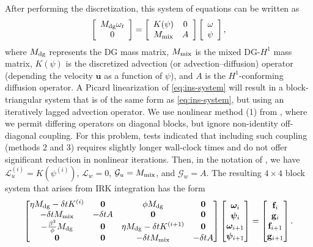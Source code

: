 \documentclass[review]{siamart}
\begin{document}
After performing the discretization, this system of equations can be written as
\begin{equation}
	\label{eq:ins-system}
	\left[ \begin{array}{c} M_{\rm dg} \omega_t \\ 0 \end{array} \right]
	=
	\left[ \begin{array}{cc} K(\psi) & 0 \\ M_{\rm mix} & A \end{array} \right]
	\left[ \begin{array}{c} \omega \\ \psi \end{array} \right],
\end{equation}
where $M_{\rm dg}$ represents the DG mass matrix, $M_{\rm mix}$ is the mixed
DG-$H^1$ mass matrix, $K(\psi)$ is the discretized advection (or
advection--diffusion) operator (depending the velocity $\bm u$ as a function of
$\psi$), and $A$ is the $H^1$-conforming diffusion operator. A Picard
linearization of \eqref{eq:ins-system} will result in a block-triangular system
that is of the same form as \eqref{eq:ins-system}, but using an iteratively
lagged advection operator. We use nonlinear method (1) from
, where we permit differing operators on diagonal
blocks, but ignore non-identity off-diagonal coupling. For this problem, tests
indicated that including such coupling (methods 2 and 3) requires slightly
longer wall-clock times and do not offer significant reduction in nonlinear
iterations. Then, in the notation of , we have $\mathcal{L}_u^{(i)} =
K(\psi^{(i)})$, $\mathcal{L}_w = 0$, $\mathcal{G}_u = M_{\rm mix}$, and
$\mathcal{G}_w = A$. The resulting $4\times4$ block system that arises from IRK
integration has the form
\begin{align} \label{eq:vsf-system-1}
	\begin{bmatrix}
		\eta M_{\rm dg} - \delta t K^{(i)} & \mathbf{0} & \phi M_{\rm dg} & \mathbf{0} \\
		-\delta t M_{\rm mix} & -\delta t A & \mathbf{0} & \mathbf{0} \\
		-\tfrac{\beta^2}{\phi}M_{\rm dg} & \mathbf{0} & \eta M_{\rm dg} - \delta t K^{(i+1)} & \mathbf{0} \\
		\mathbf{0} & \mathbf{0} & -\delta t M_{\rm mix} & -\delta t A
	\end{bmatrix}
	\begin{bmatrix} \bm\omega_i \\ \bm\psi_i \\ \bm\omega_{i+1} \\ \bm\psi_{i+1} \end{bmatrix}
	=
	\begin{bmatrix} \mathbf{f}_i \\ \mathbf{g}_i \\ \mathbf{f}_{i+1} \\ \mathbf{g}_{i+1} \end{bmatrix}.
\end{align}
\end{document}
